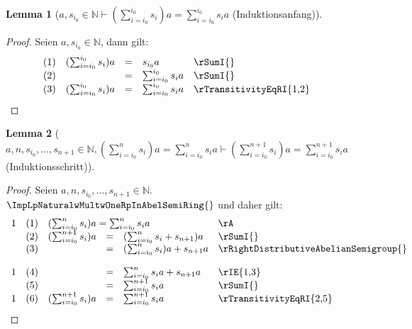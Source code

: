 \documentclass{book}
\theoremstyle{plain}
\newtheorem*{lemma}{Lemma} %
\theoremstyle{remark}
\theoremstyle{definition}
\begin{document}
\label{awsSubLbiSubZeroRbInNaturalImpLpSumSubLbiEqualsiSubZeroRbPowerLbiSubZeroRbsSubiRpaEqualsSumSubLbiEqualsiSubZeroRbPowerLbiSubZeroRbsSubia}
\begin{lemma}[\(a,s_{i_0}\in\mathbb{N}\vdash (\sum_{i=i_0}^{i_0} s_i)a=\sum_{i=i_0}^{i_0} s_ia\) (Induktionsanfang)]
\end{lemma}
\begin{proof}
    Seien \(a,s_{i_0}\in\mathbb{N}\), dann gilt:
    \[
	\begin{array}{llcll p{5cm}}
              &  (1)  & (\sum_{i=i_0}^{i_0} s_i)a &=& s_{i_0}a & \rSumI{} \\
              &  (2)  &  &=& \sum_{i=i_0}^{i_0} s_ia & \rSumI{} \\
              &  (3)  &  (\sum_{i=i_0}^{i_0} s_i)a&=& \sum_{i=i_0}^{i_0} s_ia & \rTransitivityEqRI{1,2} \\
        \end{array}
    \]
\end{proof}

\label{awnwsSubLbiSubZeroRbwDotswsSubLbnPlusOneRbInNaturalwLpSumSubLbiEqualsiSubZeroRbPowerLbnRbsSubiRpaEqualsSumSubLbiEqualsiSubZeroRbPowerLbnRbsSubiaImpLpSumSubLbiEqualsiSubZeroRbPowerLbnPlusOneRbsSubiRpaEqualsSumSubLbiEqualsiSubZeroRbPowerLbnPlusOneRbsSubia}
\begin{lemma}[\(a,n,s_{i_0},\dots,s_{n+1}\in\mathbb{N},(\sum_{i=i_0}^{n} s_i)a=\sum_{i=i_0}^{n} s_ia\vdash (\sum_{i=i_0}^{n+1} s_i)a=\sum_{i=i_0}^{n+1} s_ia\) (Induktionsschritt)]
\end{lemma}
\begin{proof}
    Seien \(a,n,s_{i_0},\dots,s_{n+1}\in\mathbb{N}\). \(\ImpLpNaturalwMultwOneRpInAbelSemiRing{}\) und daher gilt:
    \[
	\begin{array}{llcll p{5cm}}
            1 &  (1)  & \multicolumn{3}{l}{(\sum_{i=i_0}^{n} s_i)a=\sum_{i=i_0}^{n} s_ia} & \rA \\
              &  (2)  & (\sum_{i=i_0}^{n+1} s_i)a &=& (\sum_{i=i_0}^{n} s_i+s_{n+1})a & \rSumI{} \\
              &  (3)  &  &=& (\sum_{i=i_0}^{n} s_i)a+s_{n+1}a & \rRightDistributiveAbelianSemigroup{} \\
            1 &  (4)  &  &=& \sum_{i=i_0}^{n} s_ia+s_{n+1}a & \rIE{1,3} \\
              &  (5)  &  &=& \sum_{i=i_0}^{n+1} s_ia & \rSumI{} \\
            1 &  (6)  & (\sum_{i=i_0}^{n+1} s_i)a &=& \sum_{i=i_0}^{n+1} s_ia & \rTransitivityEqRI{2,5} \\
        \end{array}
    \]
\end{proof}
\end{document}
